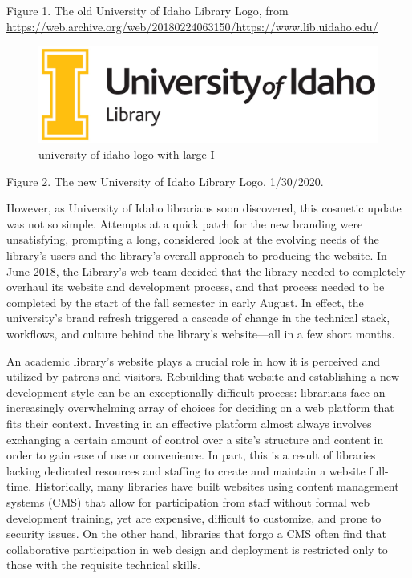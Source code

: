 \documentclass{book}
\begin{document}
Figure 1. The old University of Idaho Library Logo, from
\url{https://web.archive.org/web/20180224063150/https://www.lib.uidaho.edu/}

\begin{figure}
\centering
\includegraphics{JGJxZF.jpg}
\caption{university of idaho logo with large I}
\end{figure}

Figure 2. The new University of Idaho Library Logo, 1/30/2020.

However, as University of Idaho librarians soon discovered, this cosmetic
update was not so simple. Attempts at a quick patch for the new branding were
unsatisfying, prompting a long, considered look at the evolving needs of the
library's users and the library's overall approach to producing the website.
In June 2018, the Library's web team decided that the library needed to
completely overhaul its website and development process, and that process
needed to be completed by the start of the fall semester in early August. In
effect, the university's brand refresh triggered a cascade of change in the
technical stack, workflows, and culture behind the library's website---all in
a few short months.

An academic library's website plays a crucial role in how it is perceived and
utilized by patrons and visitors. Rebuilding that website and establishing a
new development style can be an exceptionally difficult process: librarians
face an increasingly overwhelming array of choices for deciding on a web
platform that fits their context. Investing in an effective platform almost
always involves exchanging a certain amount of control over a site's structure
and content in order to gain ease of use or convenience. In part, this is a
result of libraries lacking dedicated resources and staffing to create and
maintain a website full-time. Historically, many libraries have built websites
using content management systems (CMS) that allow for participation from staff
without formal web development training, yet are expensive, difficult to
customize, and prone to security issues. On the other hand, libraries that
forgo a CMS often find that collaborative participation in web design and
deployment is restricted only to those with the requisite technical skills.
\end{document}
